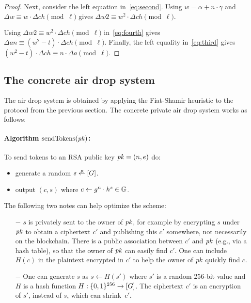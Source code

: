 \documentclass[11pt]{article}
\begin{document}
\begin{proof}
Next, consider the left equation in~\eqref{eq:second}.
Using $w = \alpha + n \cdot \gamma$ and
$\Delta w \equiv w \cdot \Delta \mathit{ch} \pmod{\ell}$ gives
$\Delta \mathit{w2} \equiv w^2 \cdot \Delta \mathit{ch} \pmod{\ell}$.

Using $\Delta \mathit{w2} \equiv w^2 \cdot \Delta \mathit{ch} \pmod{\ell}$
in~\eqref{eq:fourth}
gives $\Delta \mathit{an} \equiv (w^2 - t) \cdot \Delta \mathit{ch} \pmod{\ell}$. 
Finally, the left equality in~\eqref{eq:third} 
gives $(w^2 - t)\cdot \Delta \mathit{ch} \equiv n \cdot \Delta a \pmod{\ell}$. 

\end{proof}




\subsection{The concrete air drop system}

The air drop system is obtained by applying the Fiat-Shamir
heuristic to the protocol from the previous section. 
The concrete private air drop system works as follows:

\paragraph{Algorithm $\text{sendTokens}(\mathit{pk})$:}
To send tokens to an RSA public key $\mathit{pk} = (n, e)$ do:
\begin{itemize}
\item 
generate a random $s \rgets \range{G}$.

\item 
output $(c, s)$ where $c \gets g^n \cdot h^s \in \mathbb G$.
\end{itemize}

\medskip\noindent 
The following two notes can help optimize the scheme:
\begin{itemize}
\item[$-$] $s$ is privately sent to the owner of $\mathit{pk}$, for example
by encrypting $s$ under $\mathit{pk}$ to obtain a ciphertext $c'$ and
publishing this $c'$ somewhere, not necessarily on the blockchain.  There is
a public association between $c'$ and $\mathit{pk}$ (e.g., via a hash table),
so that the owner of $\mathit{pk}$ can easily find $c'$.  One can include
$H(c)$ in the plaintext encrypted in $c'$ to help the owner of $\mathit{pk}$
quickly find $c$.  

\item[$-$] One can generate $s$ 
as $s \gets H(s')$ where $s'$ is a random 256-bit value and $H$ is a hash
function $H:\{0,1\}^{256} \to [{G}]$.  The ciphertext $c'$ is
an encryption of $s'$, instead of $s$, which can shrink~$c'$.
\end{itemize}
\end{document}
